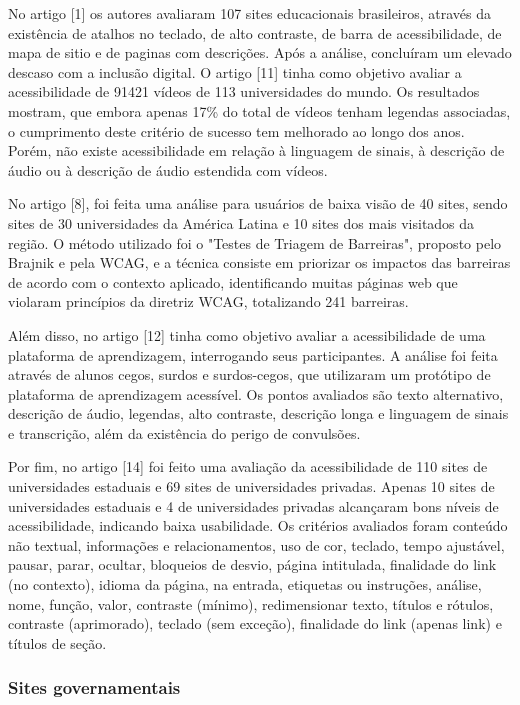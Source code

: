\documentclass[a4paper]{article}
\begin{document}
\begin{titlepage}
No artigo [1] os autores avaliaram 107 sites educacionais brasileiros, através da existência de atalhos no teclado, de alto contraste, de barra de acessibilidade, de mapa de sitio e de paginas com descrições. Após a análise, concluíram um elevado descaso com a inclusão digital. O artigo [11] tinha como objetivo avaliar a acessibilidade de 91421 vídeos de 113 universidades do mundo. Os resultados mostram, que embora apenas 17\% do total de vídeos tenham legendas associadas, o cumprimento deste critério de sucesso tem melhorado ao longo dos anos. Porém, não existe acessibilidade em relação à linguagem de sinais, à descrição de áudio ou à descrição de áudio estendida com vídeos.

No artigo [8], foi feita uma análise para usuários de baixa visão de 40 sites, sendo sites de 30 universidades da América Latina e 10 sites dos mais visitados da região. O método utilizado foi o "Testes de Triagem de Barreiras", proposto pelo Brajnik e pela WCAG, e a técnica consiste em priorizar os impactos das barreiras de acordo com o contexto aplicado, identificando muitas páginas web que violaram princípios da diretriz WCAG, totalizando 241 barreiras.

Além disso, no artigo [12] tinha como objetivo avaliar a acessibilidade de uma plataforma de aprendizagem, interrogando seus participantes. A análise foi feita através de alunos cegos, surdos e surdos-cegos, que utilizaram um protótipo de plataforma de aprendizagem acessível. Os pontos avaliados são texto alternativo, descrição de áudio, legendas, alto contraste, descrição longa e linguagem de sinais e transcrição, além da existência do perigo de convulsões. 

Por fim, no artigo [14] foi feito uma avaliação da acessibilidade de 110 sites de universidades estaduais e 69 sites de universidades privadas. Apenas 10 sites de universidades estaduais e 4 de universidades privadas alcançaram bons níveis de acessibilidade, indicando baixa usabilidade. Os critérios avaliados foram conteúdo não textual, informações e relacionamentos, uso de cor, teclado, tempo ajustável, pausar, parar, ocultar, bloqueios de desvio, página intitulada, finalidade do link (no contexto), idioma da página, na entrada, etiquetas ou instruções, análise, nome, função, valor, contraste (mínimo), redimensionar texto, títulos e rótulos, contraste (aprimorado), teclado (sem exceção), finalidade do link (apenas link) e títulos de seção.

\subsubsection{Sites governamentais}


\end{titlepage}
\end{document}
